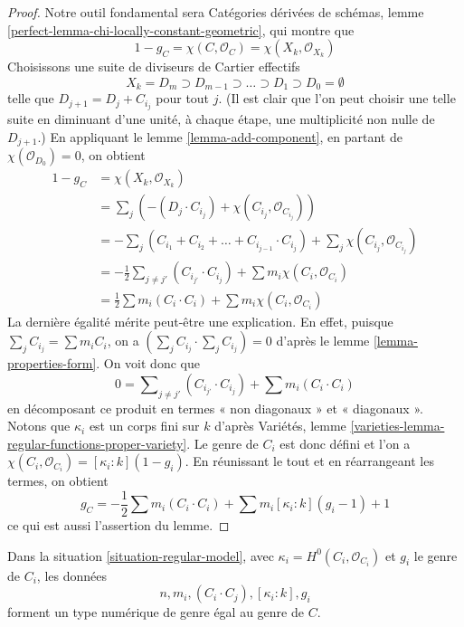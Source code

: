 \begin{proof}
Notre outil fondamental sera Catégories dérivées de schémas, lemme
\ref{perfect-lemma-chi-locally-constant-geometric},
qui montre que
$$
1 - g_C = \chi(C, \mathcal{O}_C) =
\chi(X_k, \mathcal{O}_{X_k})
$$
Choisissons une suite de diviseurs de Cartier effectifs
$$
X_k = D_m \supset D_{m - 1} \supset \ldots \supset D_1 \supset D_0 = \emptyset
$$
telle que $D_{j + 1} = D_j + C_{i_j}$ pour tout $j$. (Il est clair que
l'on peut choisir une telle suite en diminuant d'une unité, à chaque étape, une multiplicité
non nulle de $D_{j + 1}$.) En appliquant le lemme \ref{lemma-add-component},
en partant de $\chi(\mathcal{O}_{D_0}) = 0$, on obtient
\begin{align*}
1 - g_C
& =
\chi(X_k, \mathcal{O}_{X_k}) \\
& =
\sum\nolimits_j
\left(-(D_j \cdot C_{i_j}) +  \chi(C_{i_j}, \mathcal{O}_{C_{i_j}})\right) \\
& =
- \sum\nolimits_j
(C_{i_1} + C_{i_2} + \ldots + C_{i_{j - 1}} \cdot C_{i_j}) +
\sum\nolimits_j \chi(C_{i_j}, \mathcal{O}_{C_{i_j}}) \\
& =
-\frac{1}{2}\sum\nolimits_{j \not = j'} (C_{i_{j'}} \cdot C_{i_j}) +
\sum m_i \chi(C_i, \mathcal{O}_{C_i}) \\
& =
\frac{1}{2} \sum m_i(C_i \cdot C_i) + \sum m_i \chi(C_i, \mathcal{O}_{C_i})
\end{align*}
La dernière égalité mérite peut-être une explication. En effet, puisque
$\sum_j C_{i_j} = \sum m_i C_i$, on a
$(\sum_j C_{i_j} \cdot \sum_j C_{i_j}) = 0$ d'après le
lemme \ref{lemma-properties-form}. On voit donc que
$$
0 = \sum\nolimits_{j \not = j'} (C_{i_{j'}} \cdot C_{i_j}) +
\sum m_i(C_i \cdot C_i)
$$
en décomposant ce produit en termes « non diagonaux » et « diagonaux ».
Notons que $\kappa_i$ est un corps fini sur $k$ d'après
Variétés, lemme \ref{varieties-lemma-regular-functions-proper-variety}.
Le genre de $C_i$ est donc défini et l'on a
$\chi(C_i, \mathcal{O}_{C_i}) = [\kappa_i : k](1 - g_i)$.
En réunissant le tout et en réarrangeant les termes, on obtient
$$
g_C = - \frac{1}{2}\sum m_i(C_i \cdot C_i) +
\sum m_i[\kappa_i : k](g_i - 1) + 1
$$
ce qui est aussi l'assertion du lemme.
\end{proof}

\begin{lemma}
\label{lemma-numerical-type-of-model}
Dans la situation \ref{situation-regular-model}, avec
$\kappa_i = H^0(C_i, \mathcal{O}_{C_i})$ et $g_i$ le genre de $C_i$,
les données
$$
n, m_i, (C_i \cdot C_j), [\kappa_i : k], g_i
$$
forment un type numérique de genre égal au genre de $C$.
\end{lemma}

